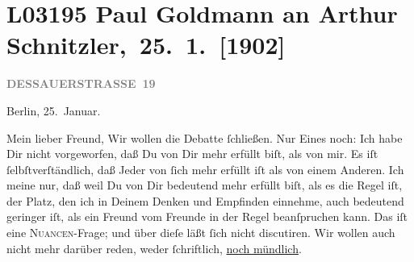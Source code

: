 

\section[ Paul Goldmann an Arthur Schnitzler, 25. 1. {[}1902{]}]{L03195 Paul Goldmann an Arthur Schnitzler, 25. 1. {[}1902{]}}
\nopagebreak{}
\rehead{ }\normalsize\beginnumbering{}
\toendnotes[C]{\smallbreak\pagebreak[2]}
\toendnotes[C]{\smallbreak}
\pstart
           \raggedleft{}{\pb}\textcolor{gray}{\textbf{DESSAUERSTRASSE 19}}\pend
           
\pstart
           Berlin, 25. Januar.\pend
           
\pstart\center{}Mein lieber Freund,\pend\vspace{0.5em}
\pstart
           Wir wollen die Debatte ſchließen. Nur Eines noch: Ich habe Dir nicht vorgeworfen, daß
               Du von Dir mehr erfüllt biſt, als von mir. Es iſt ſelbſtverſtändlich, daß Jeder von
               ſich mehr erfüllt iſt als von einem Anderen. Ich meine nur, daß \strikeout{\textcolor{gray}{ich in Deinen}} weil Du von Dir bedeutend mehr erfüllt biſt, als es die Regel iſt, der Platz,
               den ich in Deinem Denken und Empfinden einnehme, auch bedeutend geringer iſt, als ein
               Freund vom Freunde in der Regel beanſpruchen kann. Das iſt eine \textsc{Nuancen}-Frage; und über dieſe läßt ſich nicht discutiren. Wir wollen auch
               nicht mehr darüber reden, weder ſchriftlich, \uline{noch
                  mündlich}.\pend
           
